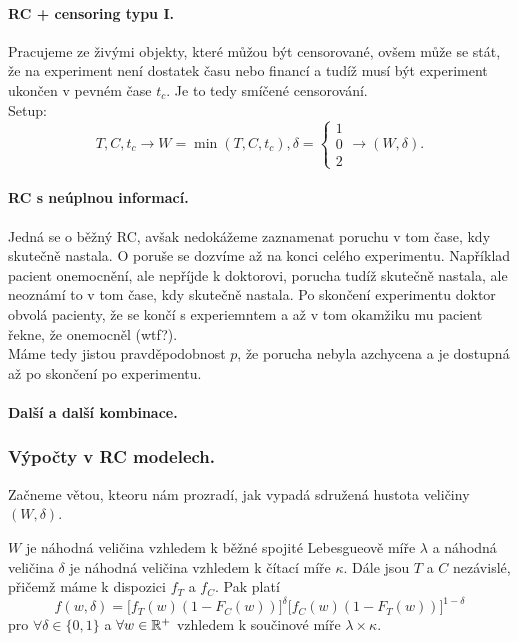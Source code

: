 \paragraph{RC + censoring typu I.}
Pracujeme ze živými objekty, které můžou být censorované, ovšem může se stát, že na experiment není dostatek času nebo financí a tudíž musí být experiment ukončen v pevném čase $t_{c}$. Je to tedy smíčené censorování.\\
Setup: $$T, C, t_c \longrightarrow W =\min(T,C,t_c), \delta =  \begin{cases}
	1 \\0\\2 \end{cases} \longrightarrow (W,\delta).$$
\paragraph{RC s neúplnou informací.}
Jedná se o běžný RC, avšak nedokážeme zaznamenat poruchu v tom čase, kdy skutečně nastala. O poruše se dozvíme až na konci celého experimentu. Například pacient onemocnění, ale nepříjde k doktorovi, porucha tudíž skutečně nastala, ale neoznámí to v tom čase, kdy skutečně nastala. Po skončení experimentu doktor obvolá pacienty, že se končí s experiemntem a až v tom okamžiku mu pacient řekne, že onemocněl (wtf?).\\
Máme tedy jistou pravděpodobnost $p$, že porucha nebyla azchycena a je dostupná až po skončení po experimentu.
\paragraph{Další a další kombinace.}
\subsubsection{Výpočty v RC modelech.}
Začneme větou, kteoru nám prozradí, jak vypadá sdružená hustota veličiny $(W, \delta)$.
\begin{theorem}
	$W$ je náhodná veličina vzhledem k běžné spojité Lebesgueově míře $\lambda$ a náhodná veličina $\delta$ je náhodná veličina vzhledem k čítací míře $\kappa$. Dále jsou $T$ a $C$ nezávislé, přičemž máme k dispozici $f_T$ a $f_C$. Pak platí
	$$f(w,\delta) =  \Big[f_T(w)(1-F_C(w))\Big] ^{\delta}\Big[f_C(w)(1-F_T(w)) \Big]^{1-\delta}$$
	pro $\forall \delta\in\lbrace 0,1\rbrace$ a $\forall w\in\mathbb{R}^{+}$ vzhledem k součinové míře $\lambda \times \kappa$.
\end{theorem}

